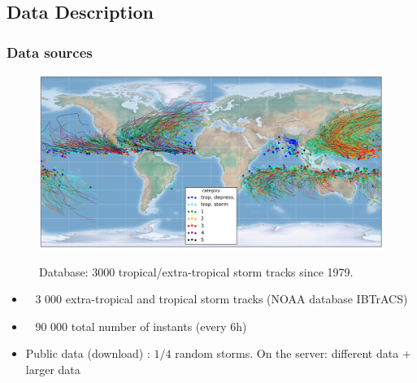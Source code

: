 \documentclass[handout]{beamer}
\begin{document}
\subsection{Data Description}

\begin{frame}
\frametitle{Data sources}
	\begin{figure}
		\includegraphics[width=0.6\linewidth]{fig/L1/all_storms.png}
		\label{fig: storm_tracks}
		\caption{Database: 3000 tropical/extra-tropical storm tracks since 1979.}
	\end{figure}

\begin{itemize}
\item ~ 3 000 extra-tropical and tropical storm tracks (NOAA database IBTrACS)		
\item ~ 90 000 total number of instants (every 6h)
\item Public data (download) : $1/4$ random storms. On the server: different data + larger data 
\end{itemize}

\end{frame}
\end{document}
